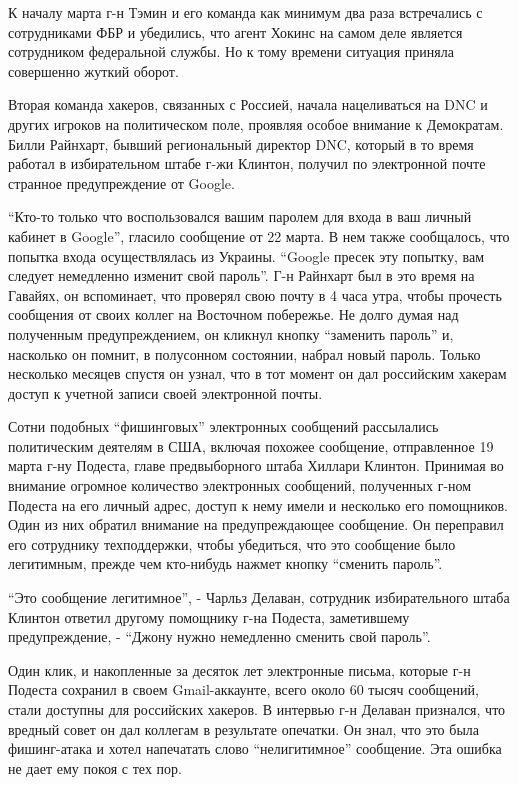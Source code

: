К началу марта г-н Тэмин и его команда как минимум два раза встречались
с сотрудниками ФБР и убедились, что агент Хокинс на самом деле является
сотрудником федеральной службы. Но к тому времени ситуация приняла
совершенно жуткий оборот.

Вторая команда хакеров, связанных с Россией, начала нацеливаться на DNC
и других игроков на политическом поле, проявляя особое внимание к
Демократам. Билли Райнхарт, бывший региональный директор DNC, который в
то время работал в избирательном штабе г-жи Клинтон, получил по
электронной почте странное предупреждение от Google.

``Кто-то только что воспользовался вашим паролем для входа в ваш личный
кабинет в Google'', гласило сообщение от 22 марта. В нем также
сообщалось, что попытка входа осуществлялась из Украины. ``Google пресек
эту попытку, вам следует немедленно изменит свой пароль''. Г-н Райнхарт
был в это время на Гавайях, он вспоминает, что проверял свою почту в 4
часа утра, чтобы прочесть сообщения от своих коллег на Восточном
побережье. Не долго думая над полученным предупреждением, он кликнул
кнопку ``заменить пароль'' и, насколько он помнит, в полусонном
состоянии, набрал новый пароль. Только несколько месяцев спустя он
узнал, что в тот момент он дал российским хакерам доступ к учетной
записи своей электронной почты.

Сотни подобных ``фишинговых'' электронных сообщений рассылались
политическим деятелям в США, включая похожее сообщение, отправленное 19
марта г-ну Подеста, главе предвыборного штаба Хиллари Клинтон. Принимая
во внимание огромное количество электронных сообщений, полученных г-ном
Подеста на его личный адрес, доступ к нему имели и несколько его
помощников. Один из них обратил внимание на предупреждающее сообщение.
Он переправил его сотруднику техподдержки, чтобы убедиться, что это
сообщение было легитимным, прежде чем кто-нибудь нажмет кнопку ``сменить
пароль''.

``Это сообщение легитимное'', - Чарльз Делаван, сотрудник избирательного
штаба Клинтон ответил другому помощнику г-на Подеста, заметившему
предупреждение, - ``Джону нужно немедленно сменить свой пароль''.

Один клик, и накопленные за десяток лет электронные письма, которые г-н
Подеста сохранил в своем Gmail-аккаунте, всего около 60 тысяч сообщений,
стали доступны для российских хакеров. В интервью г-н Делаван признался,
что вредный совет он дал коллегам в результате опечатки. Он знал, что
это была фишинг-атака и хотел напечатать слово ``нелигитимное''
сообщение. Эта ошибка не дает ему покоя с тех пор.

